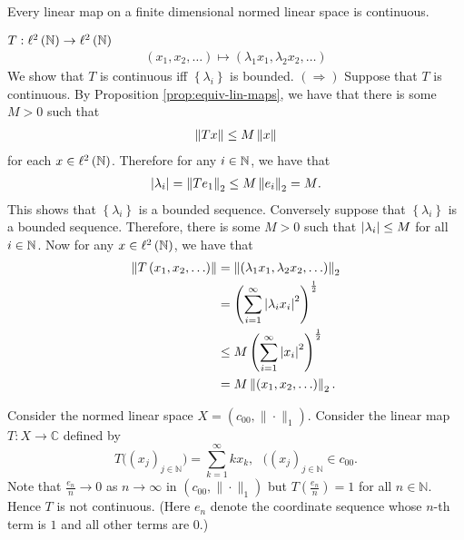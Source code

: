 \begin{proposition}
    Every linear map on a finite dimensional normed linear space is continuous.
    \label{prop:lin-map-on-fin-dim-cont}
\end{proposition}

\begin{example}
    $T: \ell ^{2} \left( \mathbb N \right) \to \ell ^{2} \left( \mathbb N \right)$
    \begin{align*}
	\left( x_{1},x_{2}, \ldots \right) \mapsto \left( \lambda_{1} x_{1}, \lambda _{2} x_{2}, \ldots \right)
    \end{align*}
    We show that $T$ is continuous iff $\left\{ \lambda_{i} \right\}$ is bounded.
    $\left( \Rightarrow \right)$ Suppose that $T$ is continuous. By Proposition \ref{prop:equiv-lin-maps}, we have that there is some $M>0$ such that
    \begin{align*}
	\left\lVert Tx \right\rVert \le M \left\lVert x \right\rVert
    \end{align*}
    for each $x\in \ell ^{2} \left( \mathbb N \right)$. Therefore for any $i\in \mathbb N$, we have that
    \begin{align*}
	\left\lvert \lambda_{i} \right\rvert = \left\lVert Te_{1} \right\rVert_{2} \le M \left\lVert e_{i} \right\rVert_{2} = M\text{.}
    \end{align*}
    This shows that $\left\{ \lambda_{i} \right\}$ is a bounded sequence. Conversely suppose that $\left\{ \lambda_{i} \right\}$ is a bounded sequence. Therefore, there is some $M> 0$ such that $\left\lvert \lambda_{i} \right\rvert \le M$ for all $i\in \mathbb N$. Now for any $x\in \ell ^{2} \left( \mathbb N \right)$, we have that
    \begin{align*}
	\left\lVert T \left( x_{1}, x_{2}, \ldots \right) \right\rVert &= \left\lVert \left( \lambda_{1} x_{1}, \lambda_{2} x_{2}, \ldots \right) \right\rVert_{2} \\
	&= \left( \sum_{i=1}^{\infty} \left\lvert \lambda_{i}x_{i} \right\rvert^{2} \right)^{\frac{1}{2}} \\
	& \le M \left( \sum_{i=1}^{\infty} \left\lvert x_{i} \right\rvert^{2} \right)^{\frac{1}{2}} \\
	&= M\left\lVert \left( x_{1}, x_{2}, \ldots \right) \right\rVert_{2}\text{.}
    \end{align*}
\end{example}

\begin{example}
Consider the normed linear space $X = (c_{00},\|\cdot\|_1).$ Consider the linear map $T: X \to \mathbb C$ defined by 
$$T \Big((x_j)_{j\in\mathbb N}\Big)= \sum\limits_{k=1}^{\infty} kx_k,\,\,\,\,((x_j)_{j\in\mathbb N}\in c_{00}.$$ 
Note that $\frac{e_n}{n}\to 0$ as $n \to \infty$ in  $(c_{00},\|\cdot\|_1)$ but $T(\frac{e_n}{n})=1$ for all $n\in\mathbb N.$ Hence $T$ is not continuous. (Here $e_n$ denote the coordinate sequence whose $n$-th term is $1$ and all other terms are $0.$)
    
\end{example}
